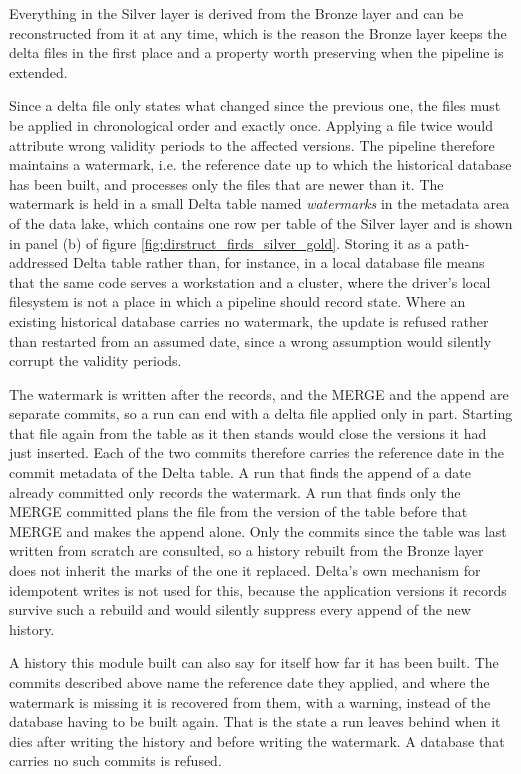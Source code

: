 Everything in the Silver layer is derived from the Bronze layer and can be reconstructed from it at any time, which is the reason the Bronze layer keeps the delta files in the first place and a property worth preserving when the pipeline is extended.

Since a delta file only states what changed since the previous one, the files must be applied in chronological order and exactly once. Applying a file twice would attribute wrong validity periods to the affected versions. The pipeline therefore maintains a watermark, i.e. the reference date up to which the historical database has been built, and processes only the files that are newer than it. The watermark is held in a small Delta table named \emph{watermarks} in the metadata area of the data lake, which contains one row per table of the Silver layer and is shown in panel (b) of figure \ref{fig:dirstruct_firds_silver_gold}. Storing it as a path-addressed Delta table rather than, for instance, in a local database file means that the same code serves a workstation and a cluster, where the driver's local filesystem is not a place in which a pipeline should record state. Where an existing historical database carries no watermark, the update is refused rather than restarted from an assumed date, since a wrong assumption would silently corrupt the validity periods.

The watermark is written after the records, and the MERGE and the append are separate commits, so a run can end with a delta file applied only in part. Starting that file again from the table as it then stands would close the versions it had just inserted. Each of the two commits therefore carries the reference date in the commit metadata of the Delta table. A run that finds the append of a date already committed only records the watermark. A run that finds only the MERGE committed plans the file from the version of the table before that MERGE and makes the append alone. Only the commits since the table was last written from scratch are consulted, so a history rebuilt from the Bronze layer does not inherit the marks of the one it replaced. Delta's own mechanism for idempotent writes is not used for this, because the application versions it records survive such a rebuild and would silently suppress every append of the new history.

A history this module built can also say for itself how far it has been built. The commits described above name the reference date they applied, and where the watermark is missing it is recovered from them, with a warning, instead of the database having to be built again. That is the state a run leaves behind when it dies after writing the history and before writing the watermark. A database that carries no such commits is refused.


